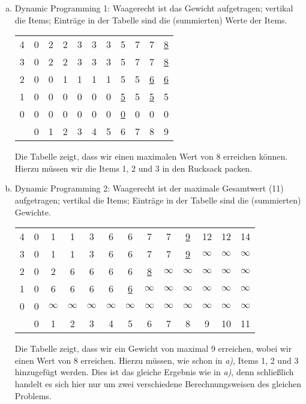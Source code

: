 \documentclass[12pt,a4paper]{article}
\begin{document}
 \begin{enumerate}[a)]
 	\item Dynamic Programming 1: Waagerecht ist das Gewicht aufgetragen; vertikal die Items; Einträge in der Tabelle sind die (summierten) Werte der Items.
 		
 		\begin{table}[hbt]
  		\begin{tabular}{l|cccccccccc}
  	 	 	4 & 0 & 2 & 2 & 3 & 3 & 3 & 5 & 7 & 7 & \underline{8} \\
	    	3 & 0 & 2 & 2 & 3 & 3 & 3 & 5 & 7 & 7 & \underline{8} \\
	    	2 & 0 & 0 & 1 & 1 & 1 & 1 & 5 & 5 & \underline{6} & \underline{6} \\
	    	1 & 0 & 0 & 0 & 0 & 0 & 0 & \underline{5} & 5 & \underline{5} & 5 \\
	    	0 & 0 & 0 & 0 & 0 & 0 & 0 & \underline{0} & 0 & 0 & 0 \\
	    	\hline
	    	  & 0 & 1 & 2 & 3 & 4 & 5 & 6 & 7 & 8 & 9 \\
  		\end{tabular}
		\end{table}
		
		Die Tabelle zeigt, dass wir einen maximalen Wert von 8 erreichen können. Hierzu müssen wir die Items 1, 2 und 3 in den Rucksack packen.

 	
 	\item Dynamic Programming 2: Waagerecht ist der maximale Gesamtwert (11) aufgetragen; vertikal die Items; Einträge in der Tabelle sind die (summierten) Gewichte.
 		
 		\begin{table}[hbt]
  		\begin{tabular}{l|cccccccccccc}
  	 	 	4 & 0 & 1 & 1 & 3 & 6 & 6 & 7 & 7 & \underline{9} & 12 & 12 & 14\\
	    	3 & 0 & 1 & 1 & 3 & 6 & 6 & 7 & 7 & \underline{9} & $\infty$ & $\infty$ & $\infty$\\
	    	2 & 0 & 2 & 6 & 6 & 6 & 6 & \underline{8} & $\infty$ & \underline{$\infty$} & $\infty$ & $\infty$ & $\infty$\\
	    	1 & 0 & 6 & 6 & 6 & 6 & \underline{6} & \underline{$\infty$} & $\infty$ & $\infty$ & $\infty$ & $\infty$ & $\infty$\\
	    	0 & 0 & $\infty$ & $\infty$ & $\infty$ & $\infty$ & \underline{$\infty$} & $\infty$ & $\infty$ & $\infty$ & $\infty$ & $\infty$ & $\infty$\\
	    	\hline
	    	  & 0 & 1 & 2 & 3 & 4 & 5 & 6 & 7 & 8 & 9 & 10 & 11\\
  		\end{tabular}
		\end{table}
 	 
 		Die Tabelle zeigt, dass wir ein Gewicht von maximal 9 erreichen, wobei wir einen Wert von 8 erreichen. Hierzu müssen, wie schon in \textit{a)}, Items 1, 2 und 3 hinzugefügt werden. Dies ist das gleiche Ergebnis wie in \textit{a)}, denn schließlich handelt es sich hier nur um zwei verschiedene Berechnungsweisen des gleichen Problems.
 	
\end{enumerate}
\end{document}
